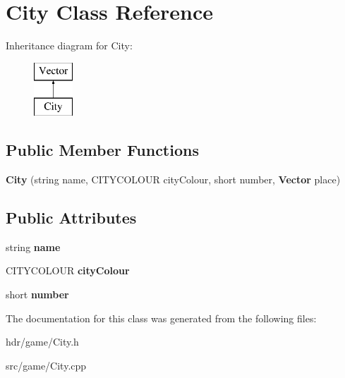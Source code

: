 \section{City Class Reference}
\label{class_city}
Inheritance diagram for City\-:\begin{figure}[H]
\begin{center}
\leavevmode
\includegraphics[height=2.000000cm]{class_city}
\end{center}
\end{figure}
\subsection*{Public Member Functions}
\begin{DoxyCompactItemize}
\item 
{\bfseries City} (string name, C\-I\-T\-Y\-C\-O\-L\-O\-U\-R city\-Colour, short number, {\bf Vector} place)\label{class_city_a086f1d9fd30ad0bcedcf72d526cbf365}

\end{DoxyCompactItemize}
\subsection*{Public Attributes}
\begin{DoxyCompactItemize}
\item 
string {\bfseries name}\label{class_city_a38b5e8b9bd4e263434eae0344913d341}

\item 
C\-I\-T\-Y\-C\-O\-L\-O\-U\-R {\bfseries city\-Colour}\label{class_city_a49ce7573be0c500755ffc346399a7ae3}

\item 
short {\bfseries number}\label{class_city_a0fecf97dc1cbd61bb1bd27325decad52}

\end{DoxyCompactItemize}


The documentation for this class was generated from the following files\-:\begin{DoxyCompactItemize}
\item 
hdr/game/City.\-h\item 
src/game/City.\-cpp\end{DoxyCompactItemize}
